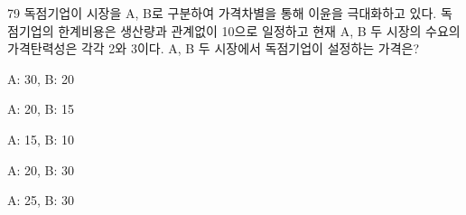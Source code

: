 \begin{question}{79}
독점기업이 시장을 A, B로 구분하여 가격차별을 통해 이윤을 극대화하고 있다. 독점기업의 한계비용은 생산량과 관계없이 10으로 일정하고 현재 A, B 두 시장의 수요의 가격탄력성은 각각 2와 3이다. A, B 두 시장에서 독점기업이 설정하는 가격은?
\begin{choices}
  \item A: 30, B: 20
  \item A: 20, B: 15
  \item A: 15, B: 10
  \item A: 20, B: 30
  \item A: 25, B: 30
\end{choices}
\end{question}
